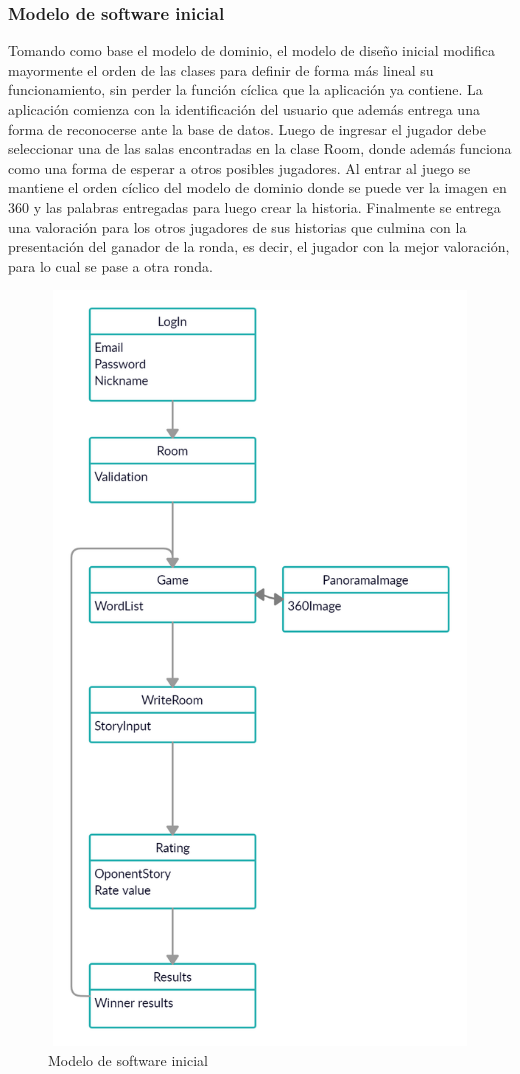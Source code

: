 \documentclass[12pt]{article}
\begin{document}
\subsubsection{Modelo de software inicial}
Tomando como base el modelo de dominio, el modelo de diseño inicial modifica mayormente el orden de las clases para definir de forma más lineal su funcionamiento, sin perder la función cíclica que la aplicación ya contiene.
La aplicación comienza con la identificación del usuario que además entrega una forma de reconocerse ante la base de datos. Luego de ingresar el jugador debe seleccionar una de las salas encontradas en la clase Room, donde además funciona como una forma de esperar a otros posibles jugadores. Al entrar al juego se mantiene el orden cíclico del modelo de dominio donde se puede ver la imagen en 360 y las palabras entregadas para luego crear la historia. Finalmente se entrega una valoración para los otros jugadores de sus historias que culmina con la presentación del ganador de la ronda, es decir, el jugador con la mejor valoración, para lo cual se pase a otra ronda.
\begin{figure}[H]
	\includegraphics[width=16cm, height=20cm]{imgs/ModeloSoftwareInicial.jpg}
	\caption{Modelo de software inicial}
\end{figure}
\end{document}
